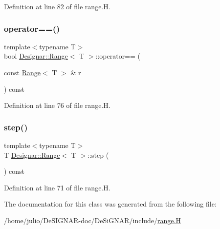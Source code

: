 Definition at line 82 of file range.\+H.

\mbox{\label{class_designar_1_1_range_ac15a931a2a2de890571f85cff64f6891}} 
\subsubsection{\texorpdfstring{operator==()}{operator==()}}
{\footnotesize\ttfamily template$<$typename T$>$ \\
bool \hyperlink{class_designar_1_1_range}{Designar\+::\+Range}$<$ T $>$\+::operator== (\begin{DoxyParamCaption}\item[{const \hyperlink{class_designar_1_1_range}{Range}$<$ T $>$ \&}]{r }\end{DoxyParamCaption}) const\hspace{0.3cm}{\ttfamily [inline]}}



Definition at line 76 of file range.\+H.

\mbox{\label{class_designar_1_1_range_a831f82b8651e4b4a437aa786288b5aef}} 
\subsubsection{\texorpdfstring{step()}{step()}}
{\footnotesize\ttfamily template$<$typename T$>$ \\
T \hyperlink{class_designar_1_1_range}{Designar\+::\+Range}$<$ T $>$\+::step (\begin{DoxyParamCaption}{ }\end{DoxyParamCaption}) const\hspace{0.3cm}{\ttfamily [inline]}}



Definition at line 71 of file range.\+H.



The documentation for this class was generated from the following file\+:\begin{DoxyCompactItemize}
\item 
/home/julio/\+De\+S\+I\+G\+N\+A\+R-\/doc/\+De\+Si\+G\+N\+A\+R/include/\hyperlink{range_8_h}{range.\+H}\end{DoxyCompactItemize}
